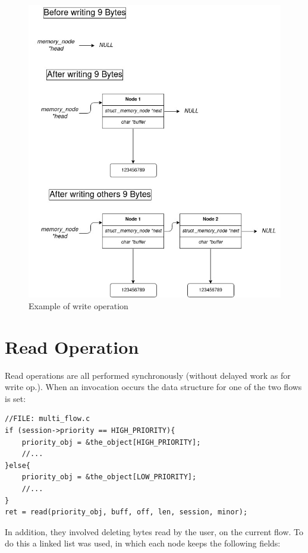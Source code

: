 \documentclass[12pt]{report}
\begin{document}
\begin{figure}[H]
\label{fig:write}
	\centering
	\includegraphics[scale = .45]{write.jpg}
	\caption{Example of write operation}
	\label{fig:write}
\end{figure}

\section{Read Operation}
\label{chap:read operation}

Read operations are all performed synchronously (without delayed work as for write op.). When an invocation occurs the data structure for one of the two flows is set:

\begin{lstlisting}
//FILE: multi_flow.c
if (session->priority == HIGH_PRIORITY){
	priority_obj = &the_object[HIGH_PRIORITY];	
	//...
}else{
	priority_obj = &the_object[LOW_PRIORITY];
	//...
}
ret = read(priority_obj, buff, off, len, session, minor);
\end{lstlisting}

In addition, they involved deleting bytes read by the user, on the current flow. To do this a linked list was used, in which each node keeps the following fields:
\end{document}
